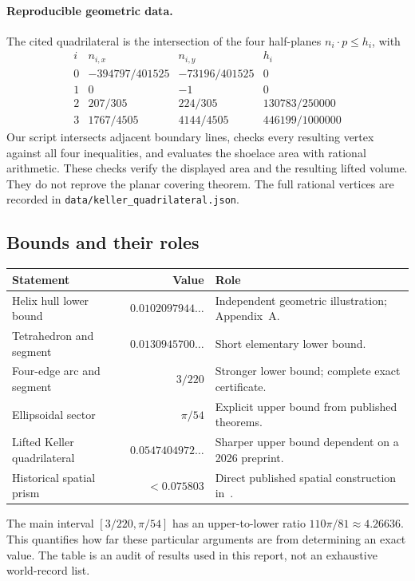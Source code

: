 \paragraph{Reproducible geometric data.}
The cited quadrilateral is the intersection of the four half-planes
$n_i\cdot p\le h_i$, with
\[
\begin{array}{c|cc|c}
i&n_{i,x}&n_{i,y}&h_i\\\hline
0&-394797/401525&-73196/401525&0\\
1&0&-1&0\\
2&207/305&224/305&130783/250000\\
3&1767/4505&4144/4505&446199/1000000
\end{array}
\]
Our script intersects adjacent boundary lines, checks every resulting
vertex against all four inequalities, and evaluates the shoelace area
with rational arithmetic. These checks verify the displayed area and
the resulting lifted volume. They do not reprove the planar covering
theorem. The full rational vertices are recorded in
\texttt{data/keller\_quadrilateral.json}.

\subsection{Bounds and their roles}
\begin{center}
\small
\begin{tabularx}{\textwidth}{@{}l r X@{}}
\toprule
Statement & Value & Role\\
\midrule
Helix hull lower bound & $0.0102097944\ldots$ & Independent geometric illustration; Appendix~A.\\[2pt]
Tetrahedron and segment & $0.0130945700\ldots$ & Short elementary lower bound.\\[2pt]
Four-edge arc and segment & $3/220$ & Stronger lower bound; complete exact certificate.\\[2pt]
Ellipsoidal sector & $\pi/54$ & Explicit upper bound from published theorems.\\[2pt]
Lifted Keller quadrilateral & $0.0547404972\ldots$ & Sharper upper bound dependent on a 2026 preprint.\\[2pt]
Historical spatial prism & $<0.075803$ & Direct published spatial construction in~\cite{HLW2001}.\\
\bottomrule
\end{tabularx}
\end{center}

The main interval $[3/220,\pi/54]$ has an upper-to-lower ratio
$110\pi/81\approx4.26636$. This quantifies how far these particular
arguments are from determining an exact value. The table is an audit
of results used in this report, not an exhaustive world-record list.

